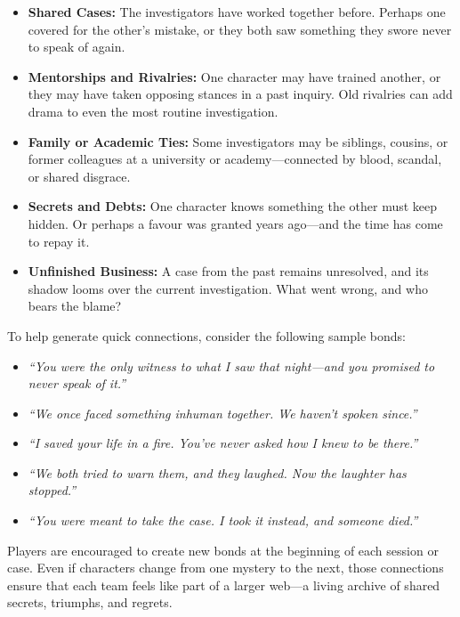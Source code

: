 \begin{itemize}\raggedright
    \item \textbf{Shared Cases:} The investigators have worked together before. Perhaps one covered for the other's mistake, or they both saw something they swore never to speak of again.
    
    \item \textbf{Mentorships and Rivalries:} One character may have trained another, or they may have taken opposing stances in a past inquiry. Old rivalries can add drama to even the most routine investigation.
    
    \item \textbf{Family or Academic Ties:} Some investigators may be siblings, cousins, or former colleagues at a university or academy—connected by blood, scandal, or shared disgrace.
    
    \item \textbf{Secrets and Debts:} One character knows something the other must keep hidden. Or perhaps a favour was granted years ago—and the time has come to repay it.
    
    \item \textbf{Unfinished Business:} A case from the past remains unresolved, and its shadow looms over the current investigation. What went wrong, and who bears the blame?
\end{itemize}

To help generate quick connections, consider the following sample bonds:

\begin{itemize}\raggedright
    \item \textit{“You were the only witness to what I saw that night—and you promised to never speak of it.”}
    \item \textit{“We once faced something inhuman together. We haven’t spoken since.”}
    \item \textit{“I saved your life in a fire. You’ve never asked how I knew to be there.”}
    \item \textit{“We both tried to warn them, and they laughed. Now the laughter has stopped.”}
    \item \textit{“You were meant to take the case. I took it instead, and someone died.”}
\end{itemize}

Players are encouraged to create new bonds at the beginning of each session or case. Even if characters change from one mystery to the next, those connections ensure that each team feels like part of a larger web—a living archive of shared secrets, triumphs, and regrets.


